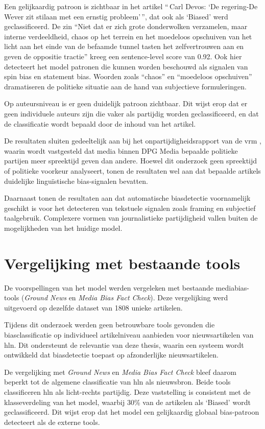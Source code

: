 Een gelijkaardig patroon is zichtbaar in het artikel ``\,Carl Devos: `De regering-De Wever zit stilaan met een ernstig probleem'\,'', dat ook als `Biased' werd geclassificeerd. De zin ``Niet dat er zich grote donderwolken verzamelen, maar interne verdeeldheid, chaos op het terrein en het moedeloos opschuiven van het licht aan het einde van de befaamde tunnel tasten het zelfvertrouwen aan en geven de oppositie tractie'' kreeg een sentence-level score van 0.92. Ook hier detecteert het model patronen die kunnen worden beschouwd als signalen van spin bias en statement bias. Woorden zoals ``chaos'' en ``moedeloos opschuiven'' dramatiseren de politieke situatie aan de hand van subjectieve formuleringen.

Op auteursniveau is er geen duidelijk patroon zichtbaar. Dit wijst erop dat er geen individuele auteurs zijn die vaker als partijdig worden geclassificeerd, en dat de classificatie wordt bepaald door de inhoud van het artikel.

De resultaten sluiten gedeeltelijk aan bij het onpartijdigheidsrapport van de \gls{vrm} \autocite{VanAelst2024}, waarin wordt vastgesteld dat media binnen DPG Media bepaalde politieke partijen meer spreektijd geven dan andere. Hoewel dit onderzoek geen spreektijd of politieke voorkeur analyseert, tonen de resultaten wel aan dat bepaalde artikels duidelijke linguïstische bias-signalen bevatten.

Daarnaast tonen de resultaten aan dat automatische biasdetectie voornamelijk geschikt is voor het detecteren van tekstuele signalen zoals framing en subjectief taalgebruik. Complexere vormen van journalistieke partijdigheid vallen buiten de mogelijkheden van het huidige model.

\section{Vergelijking met bestaande tools}
\label{sec:vergelijking-bestaande-tools}

De voorspellingen van het model werden vergeleken met bestaande mediabias-tools (\textit{Ground News} en \textit{Media Bias Fact Check}). Deze vergelijking werd uitgevoerd op dezelfde dataset van 1808 unieke artikelen.

Tijdens dit onderzoek werden geen betrouwbare tools gevonden die biasclassificatie op individueel artikelniveau aanbieden voor nieuwsartikelen van \gls{hln}. Dit ondersteunt de relevantie van deze thesis, waarin een systeem wordt ontwikkeld dat biasdetectie toepast op afzonderlijke nieuwsartikelen.

De vergelijking met \textit{Ground News} en \textit{Media Bias Fact Check} bleef daarom beperkt tot de algemene classificatie van \gls{hln} als nieuwsbron. Beide tools classificeren \gls{hln} als licht-rechts partijdig. Deze vaststelling is consistent met de klasseverdeling van het model, waarbij 30\% van de artikelen als `Biased' wordt geclassificeerd. Dit wijst erop dat het model een gelijkaardig globaal bias-patroon detecteert als de externe tools.